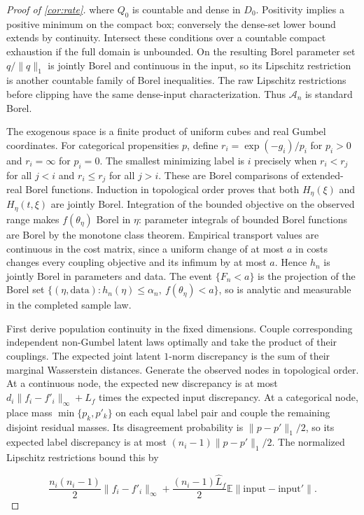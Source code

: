 \begin{proof}[Proof of \cref{cor:rate}]
where $Q_0$ is countable and dense in $D_0$. Positivity implies a positive minimum on the compact box; conversely the dense-set lower bound extends by continuity. Intersect these conditions over a countable compact exhaustion if the full domain is unbounded. On the resulting Borel parameter set $q/\|q\|_1$ is jointly Borel and continuous in the input, so its Lipschitz restriction is another countable family of Borel inequalities. The raw Lipschitz restrictions before clipping have the same dense-input characterization. Thus $\mathcal A_n$ is standard Borel. 

The exogenous space is a finite product of uniform cubes and real Gumbel coordinates. For categorical propensities $p$, define $r_i=\exp(-g_i)/p_i$ for $p_i>0$ and $r_i=\infty$ for $p_i=0$. The smallest minimizing label is $i$ precisely when $r_i<r_j$ for all $j<i$ and $r_i\leqslant r_j$ for all $j>i$. These are Borel comparisons of extended-real Borel functions. Induction in topological order proves that both $H_\eta(\xi)$ and $H_\eta(t,\xi)$ are jointly Borel. Integration of the bounded objective on the observed range makes $f(\theta_\eta)$ Borel in $\eta$: parameter integrals of bounded Borel functions are Borel by the monotone class theorem. Empirical transport values are continuous in the cost matrix, since a uniform change of at most $a$ in costs changes every coupling objective and its infimum by at most $a$. Hence $h_n$ is jointly Borel in parameters and data. The event $\{F_n<a\}$ is the projection of the Borel set $\{(\eta,\text{data}):h_n(\eta)\leqslant\alpha_n,\ f(\theta_\eta)<a\}$, so is analytic and measurable in the completed sample law. 

First derive population continuity in the fixed dimensions. Couple corresponding independent non-Gumbel latent laws optimally and take the product of their couplings. The expected joint latent $1$-norm discrepancy is the sum of their marginal Wasserstein distances. Generate the observed nodes in topological order. At a continuous node, the expected new discrepancy is at most $d_i\|f_i-f'_i\|_\infty+\hat L_f$ times the expected input discrepancy. At a categorical node, place mass $\min\{p_k,p'_k\}$ on each equal label pair and couple the remaining disjoint residual masses. Its disagreement probability is $\|p-p'\|_1/2$, so its expected label discrepancy is at most $(n_i-1)\|p-p'\|_1/2$. The normalized Lipschitz restrictions bound this by

\[
\frac{n_i(n_i-1)}2\|f_i-f'_i\|_\infty+\frac{(n_i-1)\hat L_f}2\mathbb E\|\text{input}-\text{input}'\|.
\]


\end{proof}
